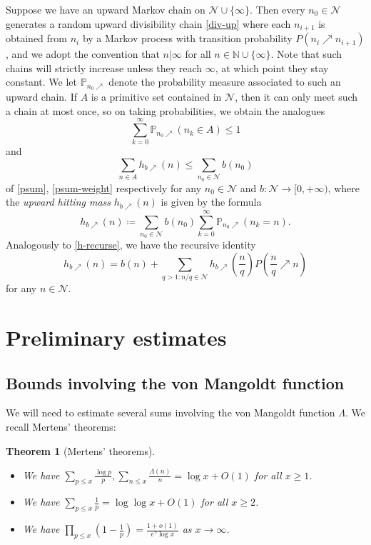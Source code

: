 \documentclass[12pt]{amsart}
\newtheorem{theorem}{Theorem}[section]
\theoremstyle{definition}
\theoremstyle{remark}
\numberwithin{equation}{section}
\newcommand{\N}{{\mathbb N}}
\newcommand{\1}{{\mathbf 1}}
\begin{document}
Suppose we have an upward Markov chain on ${\mathcal N} \cup \{\infty\}$.  Then every $n_0 \in {\mathcal N}$ generates a random upward divisibility chain \eqref{div-up}
where each $n_{i+1}$ is obtained from $n_i$ by a Markov process with transition probability $P(n_i \nearrow n_{i+1})$, and we adopt the convention that $n | \infty$ for all $n \in \N \cup \{\infty\}$.  Note that such chains will strictly increase unless they reach $\infty$, at which point they stay constant.
We let $\mathbb{P}_{n_0\nearrow}$ denote the probability measure associated to such an upward chain.  If $A$ is a primitive set contained in ${\mathcal N}$, then it can only meet such a chain at most once, so on taking probabilities, we obtain the analogues
\begin{equation}\label{psum-upper}
 \sum_{k=0}^\infty \mathbb{P}_{n_0\nearrow}( n_k \in A) \leq 1
\end{equation}
and
\begin{equation}\label{psum-weight-upper}
\sum_{n \in A} h_{b\nearrow}(n) \leq \sum_{n_0\in\mathcal N}b(n_0)
\end{equation}
of \eqref{psum}, \eqref{psum-weight} respectively for any $n_0 \in {\mathcal N}$ and $b \colon {\mathcal N} \to [0,+\infty)$, where
the \emph{upward hitting mass} $h_{b\nearrow}(n)$ is given by the formula 
$$ h_{b\nearrow}(n) \coloneq \sum_{n_0 \in {\mathcal N}} b(n_0) \sum_{k=0}^\infty \mathbb{P}_{n_0\nearrow}( n_k = n ).$$
Analogously to \eqref{h-recurse}, we have the recursive identity
\begin{equation}\label{h-recurse-upper}
 h_{b\nearrow}(n) = b(n) + \sum_{q > 1: n/q \in {\mathcal N}} h_{b\nearrow}\left(\frac{n}{q}\right) P\left(\frac{n}{q} \nearrow n\right)
\end{equation}
for any $n \in {\mathcal N}$.

\section{Preliminary estimates}

\subsection{Bounds involving the von Mangoldt function}

We will need to estimate several sums involving the von Mangoldt function $\Lambda$.  We recall Mertens' theorems:

\begin{theorem}[Mertens' theorems]\label{Mertens}\ 
\begin{itemize}
    \item[(i)]  We have $\sum_{p \leq x} \frac{\log p}{p}, \sum_{n \leq x} \frac{\Lambda(n)}{n} = \log x + O(1)$ for all $x \geq 1$.
    \item[(ii)]  We have $\sum_{p \leq x} \frac{1}{p} = \log\log x + O(1)$ for all $x \geq 2$.
    \item[(iii)]  We have $\prod_{p \leq x} (1 - \frac{1}{p}) =  \frac{1+o(1)}{e^\gamma \log x}$ as $x \to \infty$.
\end{itemize}
\end{theorem}
\end{document}
